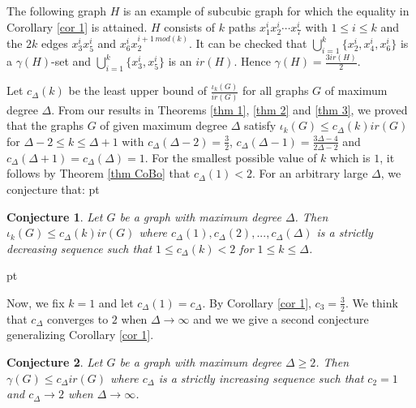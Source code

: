 \documentclass[11pt]{article}
\newtheorem{conj}{Conjecture}
\newcommand{\2}{ \vspace{0.2cm} }
\newcommand{\1}{ \vspace{0.1cm} }
\begin{document}
The following graph $H$ is an example of subcubic graph for which the equality in Corollary \ref{cor 1} is attained. $H$ consists of $k$ paths $x_1^ix_2^i \cdots x_7^i$ with $1\le i\le k$ and the $2k$ edges $x_3^ix_5^i$ and  $x_6^ix_2^{i+1 \,mod (k)}$. It can be checked that $\bigcup_{i=1}^k\{x_2^i,x_4^i,x_6^i\}$ is a $\gamma(H)$-set and $\bigcup_{i=1}^k\{x_3^i,x_5^i\}$ is an $ir(H)$. Hence $\gamma(H)= \frac{3ir(H)}{2}$.

\indent  Let $c_{\Delta}(k)$ be the least upper bound of $\frac{\iota_{k}(G)}{ir(G)}$ for all graphs $G$ of maximum degree $\Delta$. From our results in Theorems \ref{thm 1}, \ref{thm 2} and \ref{thm 3}, we proved that the graphs $G$ of given maximum degree $\Delta$ satisfy $\iota_{k}(G) \leq c_{\Delta}(k)ir(G)$ for $\Delta -2\le k\le \Delta + 1$ with
 $c_{\Delta}(\Delta -2)=\frac{3}{2}$,  $c_{\Delta}(\Delta -1)=\frac{3\Delta -4}{2\Delta -2}$ and $c_{\Delta}(\Delta + 1)=c_{\Delta}(\Delta)=1$. For the smallest possible value of $k$ which is $1$, it follows by Theorem \ref{thm CoBo} that $c_{\Delta}(1) < 2$. For an arbitrary large $\Delta$, we conjecture that:
 pt

\begin{conj}
Let $G$ be a graph with maximum degree $\Delta$. Then $\iota_{k}(G) \leq c_{\Delta}(k)ir(G)$ where $c_{\Delta}(1), c_{\Delta}(2), ..., c_{\Delta}(\Delta)$ is a strictly decreasing sequence such that $1 \leq c_{\Delta}(k) < 2$ for  $1 \leq k \leq \Delta$.
\end{conj}
 pt

\noindent Now, we fix $k=1$ and let $c_{\Delta}(1)=c_{\Delta}$. By Corollary \ref{cor 1}, $c_{3} = \frac{3}{2}$.
We think that $c_{\Delta}$ converges to $2$ when $\Delta \rightarrow \infty$ and we we give a second conjecture generalizing Corollary \ref{cor 1}.

\begin{conj}
Let $G$ be a graph with maximum degree $\Delta \ge 2$. Then $\gamma(G) \leq c_{\Delta}ir(G)$ where $c_{\Delta}$ is a strictly increasing sequence such that $c_2=1$ and  $c_{\Delta} \rightarrow 2$ when $\Delta \rightarrow \infty$.
\end{conj}
\end{document}
